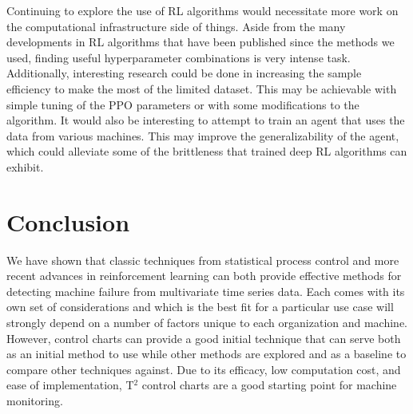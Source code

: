 \documentclass[12pt]{article}
\begin{document}
Continuing to explore the use of RL algorithms would necessitate more work on the computational infrastructure side of things. Aside from the many developments in RL algorithms that have
been published since the methods we used, finding useful hyperparameter combinations is very intense task. Additionally, interesting research could be done in increasing the sample efficiency
to make the most of the limited dataset. This may be achievable with simple tuning of the PPO parameters or with some modifications to the algorithm. It would also be interesting
to attempt to train an agent that uses the data from various machines. This may improve the generalizability of the agent, which could alleviate some of the brittleness that trained deep RL
algorithms can exhibit.

\section{Conclusion} \label{conc}
We have shown that classic techniques from statistical process control and more recent advances in reinforcement learning can both provide effective methods for detecting machine failure
from multivariate time series data. Each comes with its own set of considerations and which is the best fit for a particular use case will strongly depend on a number of factors unique
to each organization and machine. However, control charts can provide a good initial technique that can serve both as an initial method to use while other methods are explored and as a
baseline to compare other techniques against. Due to its efficacy, low computation cost, and ease of implementation, T$^2$ control charts are a good starting point for machine monitoring.

{}

\end{document}
